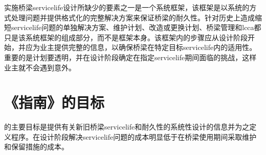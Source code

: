 
实施桥梁\gls*{servicelife}设计所缺少的要素之一是一个系统框架，该框架是以系统的方式处理问题并提供格式化的完整解决方案来保证桥梁的耐久性。针对历史上造成缩短\gls*{servicelife}问题的单独解决方案、维护计划、改造或更换计划、桥梁管理和\acrlong*{lcca}都只是该系统框架的组成部分，而不是框架本身。该框架内的步骤应从设计阶段开始，并应为业主提供完整的信息，以确保桥梁在特定目标\gls*{servicelife}内的适用性。重要的是计划要透明，并在设计阶段确定在指定\gls*{servicelife}期间面临的挑战，这样业主就不会遇到意外。

\section{《指南》的目标}
的主要目标是提供有关新旧桥梁\gls*{servicelife}和耐久性的系统性设计的信息并为之定义程序。在设计阶段解决\gls*{servicelife}问题的成本明显低于在桥梁使用期间采取维护和保留措施的成本。

